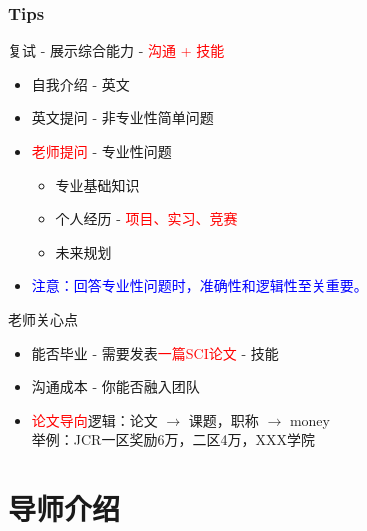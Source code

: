 \documentclass[slide]{../custom}
\begin{document}
\begin{frame}
  \frametitle{Tips}
  \begin{block}{复试 - 展示综合能力 - \textcolor{red}{沟通 + 技能}}
    \begin{itemize}
      \item 自我介绍 - 英文
      \item 英文提问 - 非专业性简单问题
      \item \textcolor{red}{老师提问} - 专业性问题
        \begin{itemize}
          \item 专业基础知识
          \item 个人经历 - \textcolor{red}{项目、实习、竞赛}
          \item 未来规划
        \end{itemize}
      \item \textcolor{blue}{注意：回答专业性问题时，准确性和逻辑性至关重要。}
    \end{itemize}
  \end{block}
  \begin{alertblock}{老师关心点}
    \begin{itemize}
      \item 能否毕业 - 需要发表\textcolor{red}{一篇SCI论文} - 技能
      \item 沟通成本 - 你能否融入团队
      \item \textcolor{red}{论文导向}逻辑：论文 $\rightarrow$ 课题，职称 $\rightarrow$ money  \\ 举例：JCR一区奖励6万，二区4万，XXX学院
    \end{itemize}
  \end{alertblock}
\end{frame}

\section{导师介绍}
\end{document}
